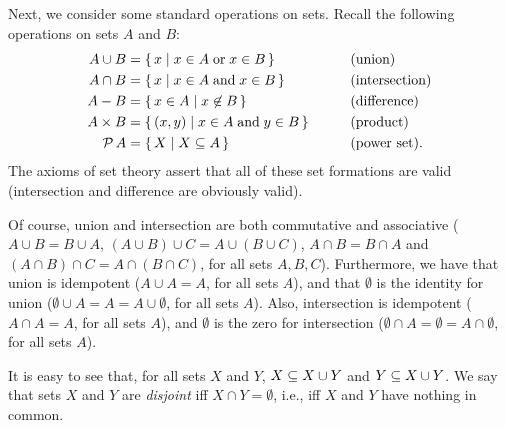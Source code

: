 Next, we consider some standard operations
on sets.  Recall the following operations on sets $A$ and $B$:
\begin{alignat*}{2}
A\cup B&=\setof{x}{x\in A\eqtxt{or}x\in B}
&&\by{union}\\
\index{ union@$\cup$}%
\index{set! union@$\cup$}%
\index{union!set}%
\index{set!union|see{union, set}}%
A\cap B&=\setof{x}{x\in A\eqtxt{and}x\in B}
&&\by{intersection} \\
\index{ intersection@$\cap$}%
\index{set! intersection@$\cap$}%
\index{intersection!set}%
\index{set!intersection|see{intersection, set}}%
A-B&=\setof{x\in A}{x\not\in B}
&&\by{difference} \\
\index{ difference@$-$}%
\index{set! difference@$-$}%
\index{difference!set}%
\index{set!difference}%
A\times B&=\setof{(x,y)}{x\in A\eqtxt{and}y\in B}
&&\by{product} \\
\index{ product@$\times$}%
\index{set! product@$\times$}%
\index{product}%
\index{set!product}%
\powset\,A&=\setof{X}{X\sub A}
&&\by{power set}.
\index{powerset@$\powset$}%
\index{set!powerset@$\powset$}%
\index{powerset}%
\index{set!powerset}%
\end{alignat*}
The axioms of set theory assert that all of these set formations
are valid (intersection and difference are obviously
valid).

Of course, union and intersection are both commutative
%
%
%
%
and associative
%
%
%
%
($A\cup B=B\cup A$, $(A\cup B)\cup C=A\cup
(B\cup C)$, $A\cap B=B\cap A$ and $(A\cap B)\cap C=A\cap (B\cap C)$,
for all sets $A, B, C$).
Furthermore, we have that union is idempotent
%
%
($A\cup A=A$, for all
sets $A$), and that $\emptyset$ is the identity
%
%
for union ($\emptyset\cup A=A=A\cup\emptyset$, for all sets $A$).
Also, intersection is idempotent
%
%
($A\cap A=A$, for all sets $A$), and
$\emptyset$ is the zero
%
%
for intersection ($\emptyset\cap
A=\emptyset=A\cap\emptyset$, for all sets $A$).

It is easy to see that, for all sets $X$ and $Y$,
$X\subseteq X\cup Y$ and $Y\subseteq X\cup Y$. We say that sets $X$ and
$Y$ are \emph{disjoint} iff $X\cap Y=\emptyset$, i.e., iff
%
%
$X$ and $Y$ have nothing in common.

